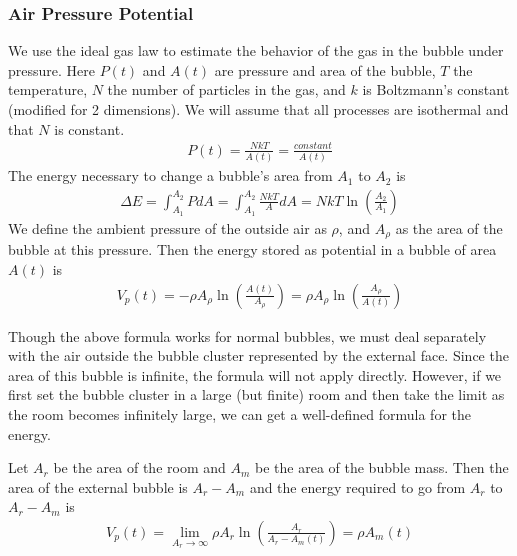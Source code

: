 \documentclass{article}
\begin{document}
\subsubsection{Air Pressure Potential}
We use the ideal gas law to estimate the
behavior of the gas in the bubble under pressure. Here $P(t)$ and $A(t)$ are
pressure and area of the bubble, $T$ the temperature, $N$ the number of particles in the
gas, and $k$ is Boltzmann's constant (modified for 2 dimensions). We will assume
that all processes are isothermal and that $N$ is constant.
\begin{align*}
P(t)=\frac{NkT}{A(t)}=\frac{constant}{A(t)}
\end{align*}
The energy necessary to change a bubble's area from $A_1$ to $A_2$ is
\begin{align*}
\Delta E = \int_{A_1}^{A_2} P dA = \int_{A_1}^{A_2} \frac{NkT}{A} dA = NkT
\ln\left(\frac{A_2}{A_1}\right)
\end{align*}
We define the ambient pressure of the outside air as $\rho$, and $A_\rho$ as
the area of the bubble at this pressure. Then the energy stored as
potential in a bubble of area $A(t)$ is
\begin{align}
V_p(t) = -\rho A_\rho \ln\left(\frac{A(t)}{A_\rho}\right) = \rho A_\rho
\ln\left(\frac{A_\rho}{A(t)}\right)
\end{align}

Though the above formula works for normal bubbles, we must deal separately with
the air outside the bubble cluster represented by the external face. Since
the area of this bubble is infinite, the formula will not apply directly.
However, if we first set the bubble cluster in a large (but finite) room and
then take the limit as the room becomes infinitely large, we can get a
well-defined formula for the energy. 

Let $A_r$ be the area of the room and $A_m$ be the area of the bubble mass. Then
the area of the external bubble is $A_r-A_m$ and the energy required to go from
$A_r$ to $A_r-A_m$ is
\begin{align}
V_p(t) = \lim_{A_r\to\infty} \rho A_r \ln\left(\frac{A_r}{A_r-A_m(t)}\right)=
\rho A_m(t)
\end{align}
\end{document}
